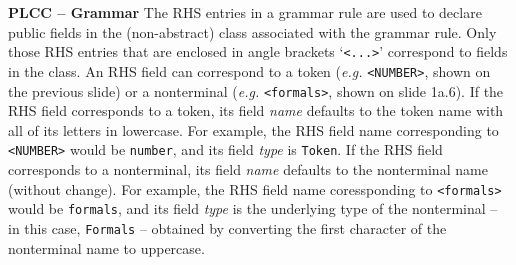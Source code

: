 \begin{minipage}[t]{\sw}
\slidenumber
\LARGE
{\bf PLCC -- Grammar}\exx
The RHS entries in a grammar rule are used
to declare public fields in the (non-abstract) class
associated with the grammar rule.
Only those RHS entries that are enclosed in angle brackets `\verb'<...>''
correspond to fields in the class.\exx
An RHS field can correspond to a token
({\em e.g.} \verb'<NUMBER>', shown on the previous slide)
or a nonterminal ({\em e.g.} \verb'<formals>', shown on slide 1a.6).\exx
If the RHS field corresponds to a token,
its field {\em name} defaults to the token name
with all of its letters in lowercase.
For example, the RHS field name corresponding
to \verb'<NUMBER>' would be \verb'number',
and its field {\em type} is \verb'Token'.
If the RHS field corresponds to a nonterminal,
its field {\em name} defaults to the nonterminal name (without change).
For example, the RHS field name coressponding
to \verb'<formals>' would be \verb'formals',
and its field {\em type} is the underlying type of the nonterminal --
in this case, \verb'Formals' --
obtained by converting the first character
of the nonterminal name to uppercase.\exx
\end{minipage}
\clearpage
